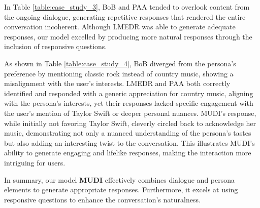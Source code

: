 \documentclass[letterpaper]{article} %
\begin{document}
In Table \ref{table:case_study_3}, BoB and PAA tended to overlook content from the ongoing dialogue, generating repetitive responses that rendered the entire conversation incoherent. Although LMEDR was able to generate adequate responses, our model excelled by producing more natural responses through the inclusion of responsive questions. 

As shown in Table \ref{table:case_study_4}, BoB diverged from the persona's preference by mentioning classic rock instead of country music, showing a misalignment with the user’s interests. LMEDR and PAA both correctly identified and responded with a generic appreciation for country music, aligning with the persona’s interests, yet their responses lacked specific engagement with the user’s mention of Taylor Swift or deeper personal nuances. MUDI's response, while initially not favoring Taylor Swift, cleverly circled back to acknowledge her music, demonstrating not only a nuanced understanding of the persona's tastes but also adding an interesting twist to the conversation. This illustrates MUDI's ability to generate engaging and lifelike responses, making the interaction more intriguing for users.

In summary, our model \textbf{MUDI} effectively combines dialogue and persona elements to generate appropriate responses. Furthermore, it excels at using responsive questions to enhance the conversation's naturalness.


\end{document}

